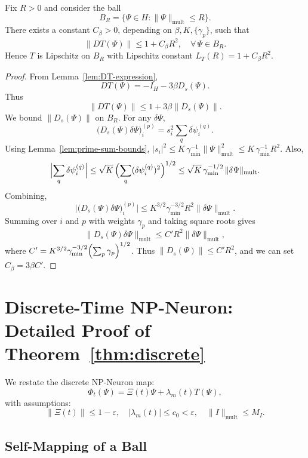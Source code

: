 \documentclass[11pt]{article}
\begin{document}
\begin{lemma}
\label{lem:T-Lipschitz}
Fix \(R>0\) and consider the ball
\[
B_R = \{\Psi\in H : \|\Psi\|_{\mathrm{mult}}\le R\}.
\]
There exists a constant \(C_\beta>0\), depending on \(\beta,K,\{\gamma_p\}\), such that
\begin{equation}
\label{eq:T-Lipschitz}
\|DT(\Psi)\| \le 1 + C_\beta R^2,
\quad
\forall\,\Psi\in B_R.
\end{equation}
Hence \(T\) is Lipschitz on \(B_R\) with Lipschitz constant
\(L_T(R) = 1 + C_\beta R^2\).
\end{lemma}

\begin{proof}
From Lemma~\ref{lem:DT-expression},
\[
DT(\Psi) = -I_H - 3\beta D_s(\Psi).
\]
Thus
\[
\|DT(\Psi)\| \le 1 + 3\beta \|D_s(\Psi)\|.
\]
We bound \(\|D_s(\Psi)\|\) on \(B_R\).
For any \(\delta\Psi\),
\[
\bigl(D_s(\Psi)\delta\Psi\bigr)_i^{(p)}
= s_i^2 \sum_{q} \delta\psi_i^{(q)}.
\]
Using Lemma~\ref{lem:prime-sum-bounds}, \(|s_i|^2 \le K\,\gamma_{\min}^{-1}\|\Psi\|_{\mathrm{mult}}^2 \le K\,\gamma_{\min}^{-1} R^2\).
Also,
\[
\Bigl|\sum_q \delta\psi_i^{(q)}\Bigr|
\le \sqrt{K}\,\Bigl(\sum_q (\delta\psi_i^{(q)})^2\Bigr)^{1/2}
\le \sqrt{K}\,\gamma_{\min}^{-1/2}\,\|\delta\Psi\|_{\mathrm{mult}}.
\]
Combining,
\[
\bigl|\bigl(D_s(\Psi)\delta\Psi\bigr)_i^{(p)}\bigr|
\le K^{3/2} \gamma_{\min}^{-3/2} R^2 \|\delta\Psi\|_{\mathrm{mult}}.
\]
Summing over \(i\) and \(p\) with weights \(\gamma_p\) and taking square roots gives
\[
\|D_s(\Psi)\delta\Psi\|_{\mathrm{mult}}
\le C' R^2 \|\delta\Psi\|_{\mathrm{mult}},
\]
where \(C' = K^{3/2}\gamma_{\min}^{-3/2}\Bigl(\sum_p \gamma_p\Bigr)^{1/2}\).
Thus \(\|D_s(\Psi)\|\le C' R^2\), and we can set \(C_\beta = 3\beta C'\).
\end{proof}

\section{Discrete-Time NP-Neuron: Detailed Proof of Theorem~\ref{thm:discrete}}

We restate the discrete NP-Neuron map:
\[
\Phi_t(\Psi) = \Xi(t)\Psi + \lambda_m(t)T(\Psi),
\]
with assumptions:
\[
\|\Xi(t)\|\le 1-\varepsilon,\quad
|\lambda_m(t)|\le c_0<\varepsilon,\quad
\|I\|_{\mathrm{mult}}\le M_I.
\]

\subsection{Self-Mapping of a Ball}
\end{document}
